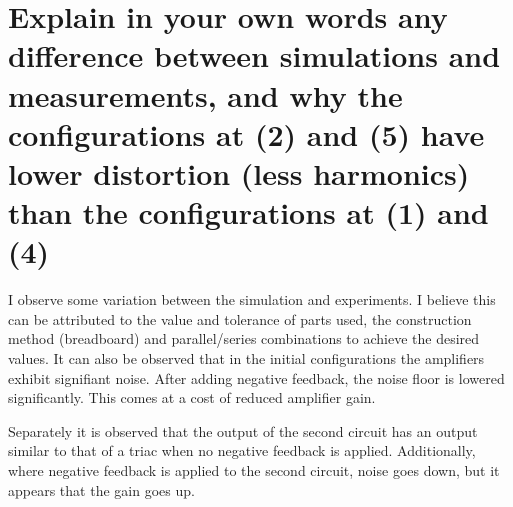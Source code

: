 \documentclass{article}
\begin{document}
	
	
	\section{Explain in your own words any difference between simulations and measurements, and why the configurations at (2) and (5) have lower distortion (less harmonics) than the configurations at (1) and (4)}
	
	
I observe some variation between the simulation and experiments. I believe this can be attributed to the value and tolerance of parts used, the construction method (breadboard) and parallel/series combinations to achieve the desired values. It can also be observed that in the initial configurations the amplifiers exhibit signifiant noise. After adding negative feedback, the noise floor is lowered significantly. This comes at a cost of reduced amplifier gain. 

Separately it is observed that the output of the second circuit has an output similar to that of a triac when no negative feedback is applied. Additionally, where negative feedback is applied to the second circuit, noise goes down, but it appears that the gain goes up.
	
		
\end{document}
